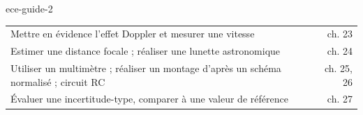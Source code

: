 \begin{blocEdition}{ece-guide-2}
\begin{tabularx}{\linewidth}{@{}Yr@{}}
Mettre en évidence l'effet Doppler et mesurer une vitesse & ch. 23 \\
Estimer une distance focale ; réaliser une lunette astronomique & ch. 24 \\
Utiliser un multimètre ; réaliser un montage d'après un schéma normalisé ; circuit RC & ch. 25, 26 \\
Évaluer une incertitude-type, comparer à une valeur de référence & ch. 27 \\\bottomrule
\end{tabularx}
\end{blocEdition}

